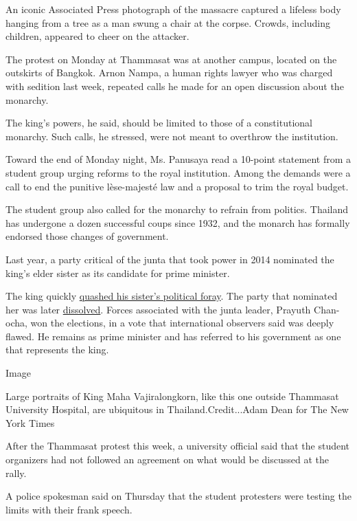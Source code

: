 An iconic Associated Press photograph of the massacre captured a
lifeless body hanging from a tree as a man swung a chair at the corpse.
Crowds, including children, appeared to cheer on the attacker.

The protest on Monday at Thammasat was at another campus, located on the
outskirts of Bangkok. Arnon Nampa, a human rights lawyer who was charged
with sedition last week, repeated calls he made for an open discussion
about the monarchy.

The king's powers, he said, should be limited to those of a
constitutional monarchy. Such calls, he stressed, were not meant to
overthrow the institution.

Toward the end of Monday night, Ms. Panusaya read a 10-point statement
from a student group urging reforms to the royal institution. Among the
demands were a call to end the punitive lèse-majesté law and a proposal
to trim the royal budget.

The student group also called for the monarchy to refrain from politics.
Thailand has undergone a dozen successful coups since 1932, and the
monarch has formally endorsed those changes of government.

Last year, a party critical of the junta that took power in 2014
nominated the king's elder sister as its candidate for prime minister.

The king quickly
\href{https://www.nytimes3xbfgragh.onion/2019/02/08/world/asia/thailand-prime-minister-princess.html}{quashed
his sister's political foray}. The party that nominated her was later
\href{https://www.nytimes3xbfgragh.onion/2019/03/07/world/asia/thailand-thai-raksa-chart-princess.html}{dissolved}.
Forces associated with the junta leader, Prayuth Chan-ocha, won the
elections, in a vote that international observers said was deeply
flawed. He remains as prime minister and has referred to his government
as one that represents the king.

Image

Large portraits of King Maha Vajiralongkorn, like this one outside
Thammasat University Hospital, are ubiquitous in Thailand.Credit...Adam
Dean for The New York Times

After the Thammasat protest this week, a university official said that
the student organizers had not followed an agreement on what would be
discussed at the rally.

A police spokesman said on Thursday that the student protesters were
testing the limits with their frank speech.

